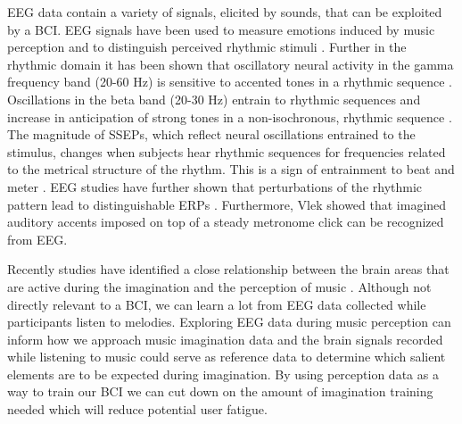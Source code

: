 EEG data contain a variety of signals, elicited by sounds, that can be exploited by a \ac{BCI}. 
\ac{EEG} signals have been used to measure emotions induced by music perception \cite{lin_eeg_2009,cabredo_emotion_2012} and to distinguish perceived rhythmic stimuli \cite{stober2014nips}.
Further in the rhythmic domain it has been shown that oscillatory neural activity in the gamma frequency band (20-60 Hz) is sensitive to accented tones in a rhythmic sequence \cite{snyder_gamma-band_2005}.
Oscillations in the beta band (20-30 Hz) entrain to rhythmic sequences \cite{cirelli_beta_2014, merchant_beta_2015} and increase in anticipation of strong tones in a non-isochronous, rhythmic sequence \cite{iversen_top-down_2009,fujioka_beta_2009,fujioka_internalized_2012}.
The magnitude of \acp{SSEP}, which reflect neural oscillations entrained to the stimulus, changes when subjects hear rhythmic sequences for frequencies related to the metrical structure of the rhythm.
This is a sign of entrainment to beat and meter \cite{nozaradan_tagging_2011,nozaradan_selective_2012}. 
\ac{EEG} studies have further shown that perturbations of the rhythmic pattern lead to distinguishable \acp{ERP} \cite{geiser_early_2009}.
Furthermore, Vlek \etal \cite{vlek_shared_2011} showed that imagined auditory accents imposed on top of a steady metronome click can be recognized from EEG.

Recently studies have identified a close relationship between the brain areas that are active during the imagination and the perception of music \cite{halpern_fmri_2004,Kraemer2005,Herholz2008,herholz_2012}. 
Although not directly relevant to a \ac{BCI}, we can learn a lot from \ac{EEG} data collected while participants listen to melodies.
Exploring EEG data during music perception can inform how we approach music imagination data and the brain signals recorded while listening to music could serve as reference data to determine which salient elements are to be expected during imagination. 
By using perception data as a way to train our \ac{BCI} we can cut down on the amount of imagination training needed which will reduce potential user fatigue.

